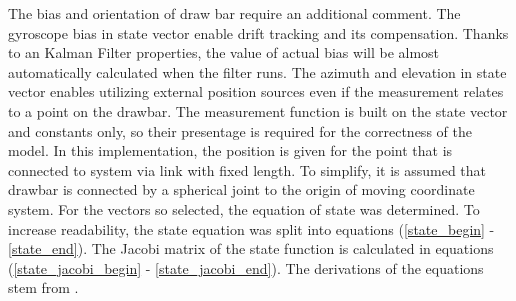 The bias and orientation of draw bar require an additional comment. The gyroscope bias in state vector enable drift tracking and its compensation. Thanks to an Kalman Filter properties, the value of actual bias will be almost automatically calculated when the filter runs. The azimuth and elevation in state vector enables utilizing external position sources even if the measurement relates to a point on the drawbar. The measurement function is built on the state vector and constants only, so their presentage is required for the correctness of the model. In this implementation, the position is given for the point that is connected to system via link with fixed length. To simplify, it is assumed that drawbar is connected by a spherical joint to the origin of moving coordinate system. For the vectors so selected, the equation of state was determined. To increase readability, the state equation was split into equations (\ref{state_begin} - \ref{state_end}). The Jacobi matrix of the state function is calculated in equations (\ref{state_jacobi_begin} - \ref{state_jacobi_end}).  The derivations of the equations stem from \cite{ekf_poor}.

